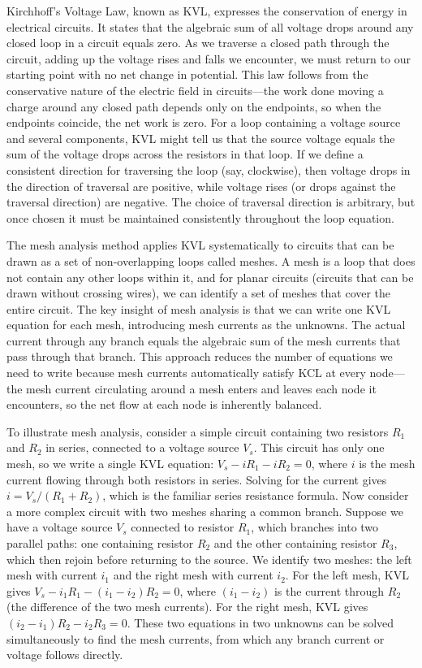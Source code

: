 Kirchhoff's Voltage Law, known as KVL, expresses the conservation of energy in electrical circuits. It states that the algebraic sum of all voltage drops around any closed loop in a circuit equals zero. As we traverse a closed path through the circuit, adding up the voltage rises and falls we encounter, we must return to our starting point with no net change in potential. This law follows from the conservative nature of the electric field in circuits—the work done moving a charge around any closed path depends only on the endpoints, so when the endpoints coincide, the net work is zero. For a loop containing a voltage source and several components, KVL might tell us that the source voltage equals the sum of the voltage drops across the resistors in that loop. If we define a consistent direction for traversing the loop (say, clockwise), then voltage drops in the direction of traversal are positive, while voltage rises (or drops against the traversal direction) are negative. The choice of traversal direction is arbitrary, but once chosen it must be maintained consistently throughout the loop equation.

The mesh analysis method applies KVL systematically to circuits that can be drawn as a set of non-overlapping loops called meshes. A mesh is a loop that does not contain any other loops within it, and for planar circuits (circuits that can be drawn without crossing wires), we can identify a set of meshes that cover the entire circuit. The key insight of mesh analysis is that we can write one KVL equation for each mesh, introducing mesh currents as the unknowns. The actual current through any branch equals the algebraic sum of the mesh currents that pass through that branch. This approach reduces the number of equations we need to write because mesh currents automatically satisfy KCL at every node—the mesh current circulating around a mesh enters and leaves each node it encounters, so the net flow at each node is inherently balanced.

To illustrate mesh analysis, consider a simple circuit containing two resistors $R_1$ and $R_2$ in series, connected to a voltage source $V_s$. This circuit has only one mesh, so we write a single KVL equation: $V_s - iR_1 - iR_2 = 0$, where $i$ is the mesh current flowing through both resistors in series. Solving for the current gives $i = V_s / (R_1 + R_2)$, which is the familiar series resistance formula. Now consider a more complex circuit with two meshes sharing a common branch. Suppose we have a voltage source $V_s$ connected to resistor $R_1$, which branches into two parallel paths: one containing resistor $R_2$ and the other containing resistor $R_3$, which then rejoin before returning to the source. We identify two meshes: the left mesh with current $i_1$ and the right mesh with current $i_2$. For the left mesh, KVL gives $V_s - i_1 R_1 - (i_1 - i_2)R_2 = 0$, where $(i_1 - i_2)$ is the current through $R_2$ (the difference of the two mesh currents). For the right mesh, KVL gives $(i_2 - i_1)R_2 - i_2 R_3 = 0$. These two equations in two unknowns can be solved simultaneously to find the mesh currents, from which any branch current or voltage follows directly.


